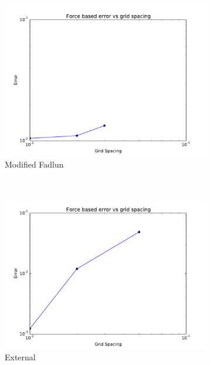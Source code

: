 \documentclass[onehalf,11pt]{beavtex}
\begin{document}
\begin{figure}[htb]
	\centering
	\begin{subfigure}{0.3\textwidth}
		\includegraphics[width=\linewidth]{error_fadlun}
		\caption{Modified Fadlun}
	\end{subfigure}
	~
	\begin{subfigure}{0.3\textwidth}
		\includegraphics[width=\linewidth]{error_external}
		\caption{External}
	\end{subfigure}
	~
	\begin{subfigure}{0.3\textwidth}

\end{subfigure}
\end{figure}
\end{document}
